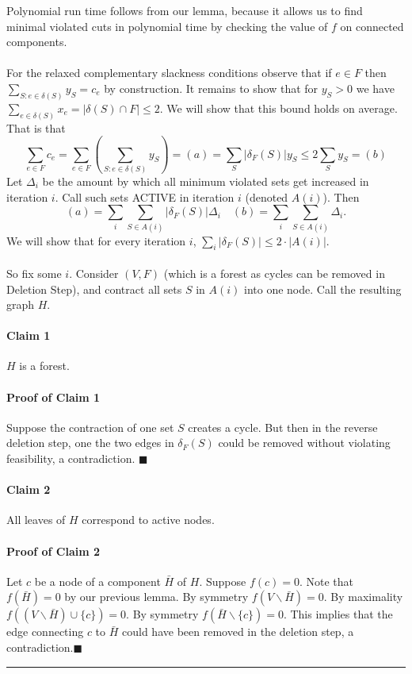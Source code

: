 \documentclass[letterpaper,12pt,oneside,onecolumn]{article}
\newenvironment{proof}{{\bf Proof:  }}{\hfill\rule{2mm}{2mm}}
\begin{document}
\begin{proof}
Polynomial run time follows from our lemma, because it allows us to find minimal violated cuts in polynomial time by checking the value of $f$ on connected components.
\paragraph{}
For the relaxed complementary slackness conditions observe that if $e \in F$ then $\sum_{S : e \in \delta(S)} y_S = c_e$ by construction.  It remains to show that for $y_S > 0$ we have $\sum_{e\in\delta(S)}  x_e = |\delta(S) \cap F| \leq 2$. We will show that this bound holds on average. That is that
$$ \sum_{e \in F} c_e = \sum_{e \in F} (\sum_{S : e \in \delta(S)} y_S) = (a) = \sum_S |\delta_F(S)| y_S \leq 2 \sum_S y_S = (b) $$
Let $\Delta_i$ be the amount by which all minimum violated sets get increased in iteration $i$. Call such sets ACTIVE in iteration $i$ (denoted $A(i)$). Then
$$(a) = \sum_i \sum_{S \in A(i)} |\delta_F(S)| \Delta_i \quad (b) = \sum_i \sum_{S\in A(i)} \Delta_i.$$
We will show that for every iteration $i$, $\sum_i |\delta_F(S)| \leq 2 \cdot |A(i)|.$
\paragraph{}
So fix some $i$. Consider $(V,F)$ (which is a forest as cycles can be removed in Deletion Step), and contract all sets $S$ in $A(i)$ into one node. Call the resulting graph $H$.
\paragraph{Claim 1}
$H$ is a forest.
\paragraph{Proof of Claim 1}
Suppose the contraction of one set $S$ creates a cycle. But then in the reverse deletion step, one the two edges in $\delta_F(S)$ could be removed without violating feasibility, a contradiction. $\blacksquare$
\paragraph{Claim 2}
All leaves of $H$ correspond to active nodes.
\paragraph{Proof of Claim 2}
Let $c$ be a node of a component $\bar{H}$ of $H$. Suppose $f(c) = 0$. Note that $f(\bar{H}) = 0$ by our previous lemma. By symmetry $f(V\backslash \bar{H}) = 0$. By maximality $f((V\backslash \bar{H})\cup \{c\}) = 0$. By symmetry $f(\bar{H}\backslash \{c\}) = 0$. This implies that the edge connecting $c$ to $\bar{H}$ could have been removed in the deletion step, a contradiction.$\blacksquare$

\end{proof}
\end{document}
